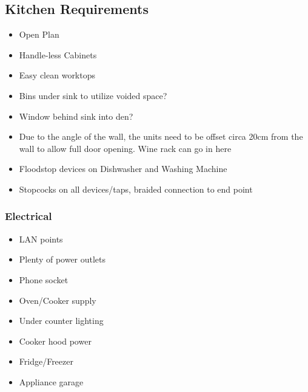 \subsection{Kitchen Requirements}
\begin{itemize}
\item Open Plan
\item Handle-less Cabinets
\item Easy clean worktops
\item Bins under sink to utilize voided space?
\item Window behind sink into den?
\item Due to the angle of the wall, the units need to be offset circa 20cm from the wall to allow full door opening. Wine rack can go in here
\item Floodstop devices on Dishwasher and Washing Machine 
\item Stopcocks on all devices/taps, braided connection to end point 
\end{itemize}

\subsubsection{Electrical}
\begin{itemize}
\item LAN points
\item Plenty of power outlets
\item Phone socket
\item Oven/Cooker supply
\item Under counter lighting
\item Cooker hood power
\item Fridge/Freezer
\item Appliance garage
\end{itemize}
